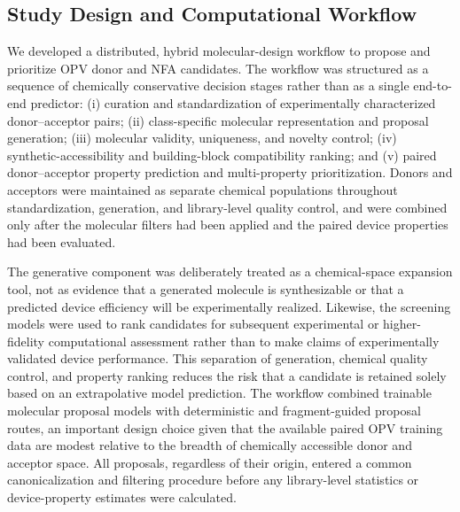 \documentclass[12pt]{article}
\begin{document}
\subsection{Study Design and Computational Workflow}
We developed a distributed, hybrid molecular-design workflow to propose and prioritize OPV donor and NFA candidates. The workflow was structured as a sequence of chemically conservative decision stages rather than as a single end-to-end predictor: (i) curation and standardization of experimentally characterized donor--acceptor pairs; (ii) class-specific molecular representation and proposal generation; (iii) molecular validity, uniqueness, and novelty control; (iv) synthetic-accessibility and building-block compatibility ranking; and (v) paired donor--acceptor property prediction and multi-property prioritization. Donors and acceptors were maintained as separate chemical populations throughout standardization, generation, and library-level quality control, and were combined only after the molecular filters had been applied and the paired device properties had been evaluated.

The generative component was deliberately treated as a chemical-space expansion tool, not as evidence that a generated molecule is synthesizable or that a predicted device efficiency will be experimentally realized. Likewise, the screening models were used to rank candidates for subsequent experimental or higher-fidelity computational assessment rather than to make claims of experimentally validated device performance. This separation of generation, chemical quality control, and property ranking reduces the risk that a candidate is retained solely based on an extrapolative model prediction. The workflow combined trainable molecular proposal models with deterministic and fragment-guided proposal routes, an important design choice given that the 
available paired OPV training data are modest relative to the breadth of chemically accessible donor and acceptor space. All proposals, regardless of their origin, entered a common canonicalization and filtering procedure before any library-level statistics or device-property estimates were calculated.
\end{document}
